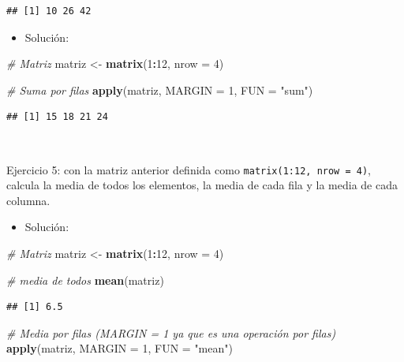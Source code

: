 \documentclass[11pt,]{book}
\newenvironment{Shaded}{\begin{snugshade}}{\end{snugshade}}
\newcommand{\CommentTok}[1]{\textcolor[rgb]{0.37,0.37,0.37}{\textit{#1}}}
\newcommand{\DataTypeTok}[1]{\textcolor[rgb]{0.27,0.27,0.27}{#1}}
\newcommand{\DecValTok}[1]{\textcolor[rgb]{0.06,0.06,0.06}{#1}}
\newcommand{\KeywordTok}[1]{\textcolor[rgb]{0.27,0.27,0.27}{\textbf{#1}}}
\newcommand{\NormalTok}[1]{#1}
\newcommand{\OperatorTok}[1]{\textcolor[rgb]{0.43,0.43,0.43}{\textbf{#1}}}
\newcommand{\StringTok}[1]{\textcolor[rgb]{0.5,0.5,0.5}{#1}}
\providecommand{\tightlist}{%
  \setlength{\itemsep}{0pt}\setlength{\parskip}{0pt}}
\begin{document}
\begin{verbatim}
## [1] 10 26 42
\end{verbatim}

\begin{itemize}
\tightlist
\item
  Solución:
\end{itemize}

\begin{Shaded}
\begin{Highlighting}[]
\CommentTok{# Matriz}
\NormalTok{matriz <-}\StringTok{ }\KeywordTok{matrix}\NormalTok{(}\DecValTok{1}\OperatorTok{:}\DecValTok{12}\NormalTok{, }\DataTypeTok{nrow =} \DecValTok{4}\NormalTok{)}

\CommentTok{# Suma por filas}
\KeywordTok{apply}\NormalTok{(matriz, }\DataTypeTok{MARGIN =} \DecValTok{1}\NormalTok{, }\DataTypeTok{FUN =} \StringTok{"sum"}\NormalTok{)}
\end{Highlighting}
\end{Shaded}

\begin{verbatim}
## [1] 15 18 21 24
\end{verbatim}

~

Ejercicio 5: con la matriz anterior definida como \texttt{matrix(1:12,\ nrow\ =\ 4)}, calcula la media de todos los elementos, la media de cada fila y la media de cada columna.

\begin{itemize}
\tightlist
\item
  Solución:
\end{itemize}

\begin{Shaded}
\begin{Highlighting}[]
\CommentTok{# Matriz}
\NormalTok{matriz <-}\StringTok{ }\KeywordTok{matrix}\NormalTok{(}\DecValTok{1}\OperatorTok{:}\DecValTok{12}\NormalTok{, }\DataTypeTok{nrow =} \DecValTok{4}\NormalTok{)}

\CommentTok{#  media de todos}
\KeywordTok{mean}\NormalTok{(matriz)}
\end{Highlighting}
\end{Shaded}

\begin{verbatim}
## [1] 6.5
\end{verbatim}

\begin{Shaded}
\begin{Highlighting}[]
\CommentTok{# Media por filas (MARGIN = 1 ya que es una operación por filas)}
\KeywordTok{apply}\NormalTok{(matriz, }\DataTypeTok{MARGIN =} \DecValTok{1}\NormalTok{, }\DataTypeTok{FUN =} \StringTok{"mean"}\NormalTok{)}
\end{Highlighting}
\end{Shaded}
\end{document}
